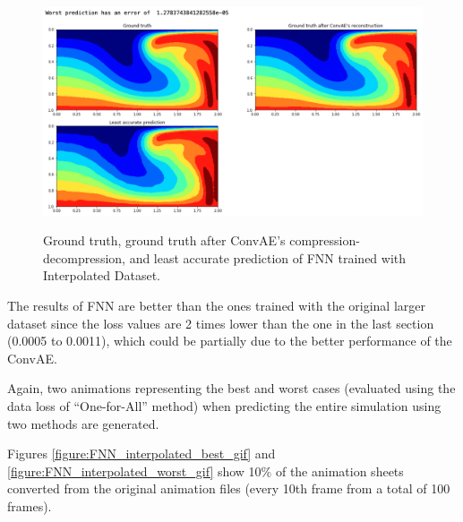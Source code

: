 \begin{figure}[H]
    \caption{Ground truth, ground truth after ConvAE's compression-decompression, and least accurate prediction of FNN trained with Interpolated Dataset.}
    \includegraphics[scale=0.5]{figures/mantle_convection_images/larger_dataset_interpolated/FNN_Worst.png}
    \label{figure:FNN_interpolated_worst}
\end{figure}

The results of FNN are better than the ones trained with the original larger dataset since the loss values are 2 times lower than the one in the last section (0.0005 to 0.0011), which could be partially due to the better performance of the ConvAE.

Again, two animations representing the best and worst cases (evaluated using the data loss of ``One-for-All'' method) when predicting the entire simulation using two methods are generated.

Figures \ref{figure:FNN_interpolated_best_gif} and \ref{figure:FNN_interpolated_worst_gif} show 10\% of the animation sheets converted from the original animation files (every 10th frame from a total of 100 frames).

